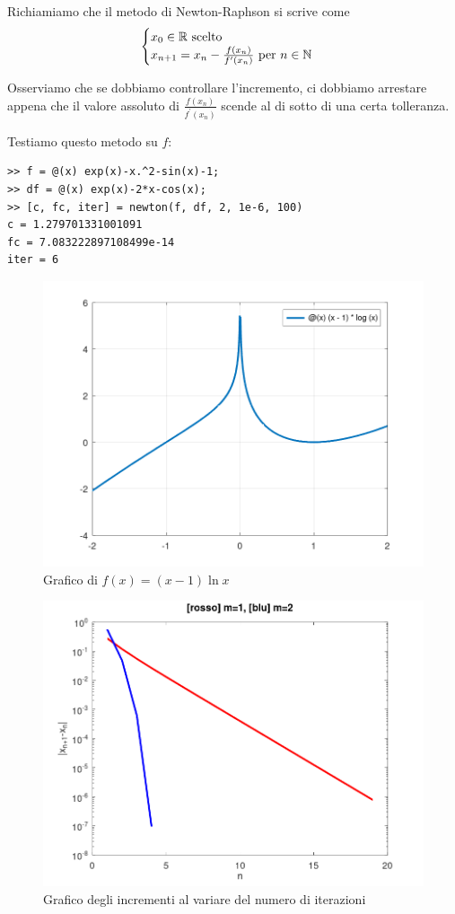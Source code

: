 Richiamiamo che il metodo di \textenglish{Newton-Raphson} si scrive come
\[\begin{cases} x_0 \in \mathbb R \text{ scelto} \\ x_{n+1} = x_n - \frac{f(x_n)}{f^\prime (x_n)} \text{ per } n \in \mathbb N \end{cases}\]

Osserviamo che se dobbiamo controllare l'incremento, ci dobbiamo arrestare appena che il valore assoluto di \(\frac{f(x_n)}{f^\prime (x_n)}\) scende al di sotto di una certa tolleranza. 



Testiamo questo metodo su \(f\):

\begin{lstlisting}[numbers=none]
>> f = @(x) exp(x)-x.^2-sin(x)-1;
>> df = @(x) exp(x)-2*x-cos(x);
>> [c, fc, iter] = newton(f, df, 2, 1e-6, 100)
c = 1.279701331001091
fc = 7.083222897108499e-14
iter = 6
\end{lstlisting}


\begin{figure}
\centering
\includegraphics[width=.7\textwidth]{../zeri/graph2.png}
\caption{Grafico di \(f(x) = (x-1)\ln x\)}
\end{figure}

\begin{figure}
\centering
\includegraphics[width=.7\textwidth]{../zeri/convergences.png}
\caption{Grafico degli incrementi al variare del numero di iterazioni}
\end{figure}

